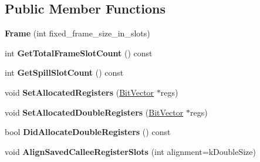 \subsection*{Public Member Functions}
\begin{DoxyCompactItemize}
\item 
{\bfseries Frame} (int fixed\+\_\+frame\+\_\+size\+\_\+in\+\_\+slots)\hypertarget{classv8_1_1internal_1_1compiler_1_1_frame_a14a536ee3a23a553cb93e15d21dd1502}{}\label{classv8_1_1internal_1_1compiler_1_1_frame_a14a536ee3a23a553cb93e15d21dd1502}

\item 
int {\bfseries Get\+Total\+Frame\+Slot\+Count} () const \hypertarget{classv8_1_1internal_1_1compiler_1_1_frame_a2f1fe8fa3f1bc02838389c0fb5b7e3a8}{}\label{classv8_1_1internal_1_1compiler_1_1_frame_a2f1fe8fa3f1bc02838389c0fb5b7e3a8}

\item 
int {\bfseries Get\+Spill\+Slot\+Count} () const \hypertarget{classv8_1_1internal_1_1compiler_1_1_frame_a59ac251397213f974ae45875a3db2ec0}{}\label{classv8_1_1internal_1_1compiler_1_1_frame_a59ac251397213f974ae45875a3db2ec0}

\item 
void {\bfseries Set\+Allocated\+Registers} (\hyperlink{classv8_1_1internal_1_1_bit_vector}{Bit\+Vector} $\ast$regs)\hypertarget{classv8_1_1internal_1_1compiler_1_1_frame_a0d49fa15e4d05e9d3733d34ce3afee32}{}\label{classv8_1_1internal_1_1compiler_1_1_frame_a0d49fa15e4d05e9d3733d34ce3afee32}

\item 
void {\bfseries Set\+Allocated\+Double\+Registers} (\hyperlink{classv8_1_1internal_1_1_bit_vector}{Bit\+Vector} $\ast$regs)\hypertarget{classv8_1_1internal_1_1compiler_1_1_frame_a6d2f8cefe32fe80c3052dfbf538b75dd}{}\label{classv8_1_1internal_1_1compiler_1_1_frame_a6d2f8cefe32fe80c3052dfbf538b75dd}

\item 
bool {\bfseries Did\+Allocate\+Double\+Registers} () const \hypertarget{classv8_1_1internal_1_1compiler_1_1_frame_a342cbae1eb9a0bd5d38fe26ab9b2bc1f}{}\label{classv8_1_1internal_1_1compiler_1_1_frame_a342cbae1eb9a0bd5d38fe26ab9b2bc1f}

\item 
void {\bfseries Align\+Saved\+Callee\+Register\+Slots} (int alignment=k\+Double\+Size)\hypertarget{classv8_1_1internal_1_1compiler_1_1_frame_addcec30d9bd94de8f64e507d0c61e91d}{}\label{classv8_1_1internal_1_1compiler_1_1_frame_addcec30d9bd94de8f64e507d0c61e91d}


\end{DoxyCompactItemize}

